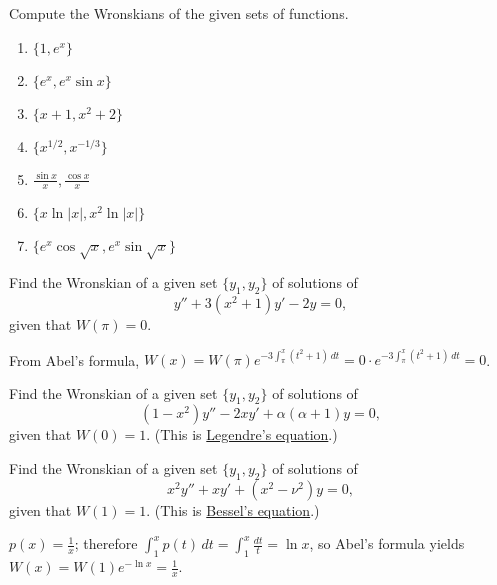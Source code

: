 \documentclass{ximera}
\begin{document}
\begin{problem}\label{exer:5.1.5}
Compute the Wronskians of the given sets of functions.

\begin{enumerate}
    \item $\{1, e^x\}$
    \item$\{e^x, e^x \sin x\}$
    \item $\{x+1,  x^2+2\}$
    \item $\{ x^{1/2}, x^{-1/3}\}$
    \item $\frac{\sin x}{x},  \frac{\cos x}{x}$
    \item $\{ x \ln|x|, x^2\ln|x|\}$
    \item $\{e^x\cos\sqrt x, e^x\sin\sqrt x\}$
\end{enumerate}
\end{problem}

\begin{problem}\label{exer:5.1.6}
Find the Wronskian  of a given set $\{y_1,y_2\}$ of solutions of
$$
y''+3(x^2+1)y'-2y=0,
$$
given that $W(\pi)=0$.

\begin{solution}
     From Abel's formula,
$W(x)=W(\pi)e^{-3\int_\pi^x (t^2+1)\,dt}=0\cdot
e^{-3\int_\pi^x (t^2+1)\,dt}=0$.
\end{solution}
\end{problem}

\begin{problem}\label{exer:5.1.7}
Find the Wronskian of a given set $\{y_1,y_2\}$ of solutions of
$$
(1-x^2)y''-2xy'+\alpha(\alpha+1)y=0,
$$
given that $W(0)=1$.  (This is
\href{http://www-history.mcs.st-and.ac.uk/PictDisplay/Legendre.html}{Legendre's equation}.)
\end{problem}

\begin{problem}\label{exer:5.1.8}
Find the Wronskian of a given set $\{y_1,y_2\}$ of solutions of
$$
x^2y''+xy'+(x^2-\nu^2)y=0 ,
$$
given that $W(1)=1$.  (This is
\href{http://www-history.mcs.st-and.ac.uk/Mathematicians/Bessel.html}
{Bessel's equation}.)

\begin{solution}
    $p(x)=\frac{1}{ x}$; therefore $\int_1^x
p(t)\,dt=\int_1^x\frac{dt}{ t}=\ln x$, so Abel's
formula yields $W(x)=W(1)e^{-\ln x}=\frac{1}{ x}$.
\end{solution}
\end{problem}
\end{document}
